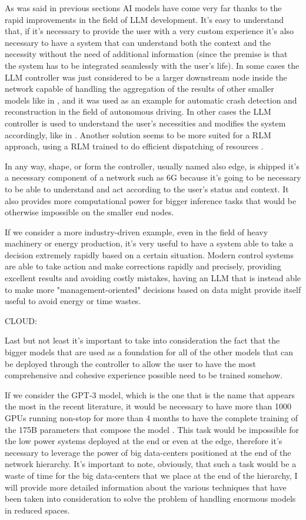 As was said in previous sections AI models have come very far thanks to the rapid improvements in
the field of LLM development. It's easy to understand that, if it's necessary to provide the user
with a very custom experience it's also necessary to have a system that can understand both the
context and the necessity without the need of additional information (since the premise is that the
system has to be integrated seamlessly with the user's life).
In some cases the LLM controller was just considered to be a larger downstream node inside the
network capable of handling the aggregation of the results of other smaller models like in
\cite{pga}, and it was used as an example for automatic crash detection and reconstruction in the
field of autonomous driving.
In other cases the LLM controller is used to understand the user's necessities and modifies the
system accordingly, like in \cite{ai4ci}. Another solution seems to be more suited for a RLM
approach, using a RLM trained to do efficient dispatching of resources \cite{llm6G}.

In any way, shape, or form the controller, usually named also edge, is shipped it's a necessary
component of a network such as 6G because it's going to be necessary to be able to understand and
act according to the user's status and context. It also provides more computational power for bigger
inference tasks that would be otherwise impossible on the smaller end nodes.

If we consider a more industry-driven example, even in the field of heavy machinery or energy
production, it's very useful to have a system able to take a decision extremely rapidly based on a
certain situation. Modern control systems are able to take action and make corrections rapidly and
precisely, providing excellent results and avoiding costly mistakes, having an LLM that is instead able
to make more "management-oriented" decisions based on data might provide itself useful to avoid
energy or time wastes.

\bigskip
\noindent
CLOUD:
\label{ssec:cloud}

Last but not least it's important to take into consideration the fact that the bigger models that
are used as a foundation for all of the other models that can be deployed through the controller to
allow the user to have the most comprehensive and cohesive experience possible need to be trained
somehow.

If we consider the GPT-3 model, which is the one that is the name that appears the most in the
recent literature, it would be necessary to have more than 1000 GPUs running non-stop for more than
4 months to have the complete training of the 175B parameters that compose the model \cite{gaisnet}. This task
would be impossible for the low power systems deployed at the end or even at the edge, therefore
it's necessary to leverage the power of big data-centers positioned at the end of the network
hierarchy. It's important to note, obviously, that such a task would be a waste of time for the big
data-centers that we place at the end of the hierarchy, I will provide more detailed information
about the various techniques that have been taken into consideration to solve the problem of
handling enormous models in reduced spaces.

